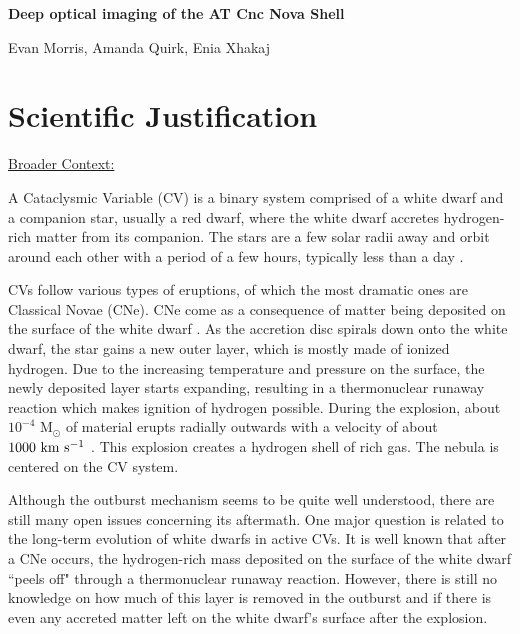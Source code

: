 \documentclass[11pt,a4paper]{article}  %
\begin{document}
\pagestyle{plain}
 


\begin{center}
{\LARGE{\bf
{Deep optical imaging of the AT Cnc Nova Shell}
}}
\end{center}

\centerline{ \large{Evan Morris, Amanda Quirk, Enia Xhakaj}}

\bigskip




\section{Scientific Justification}

\underline{Broader Context:} 

\par A Cataclysmic Variable (CV) is a binary system comprised of a white dwarf and a companion star, usually a red dwarf, where the white dwarf accretes hydrogen-rich matter from its companion. The stars are a few solar radii away and orbit around each other with a period of a few hours, typically less than a day \cite{smith2006Cataclysmic}. 

CVs follow various types of eruptions, of which the most dramatic ones are Classical Novae (CNe). CNe come as a consequence of matter being deposited on the surface of the white dwarf \cite{starrfield2016thermonuclear}. As the accretion disc spirals down onto the white dwarf, the star gains a new outer layer, which is mostly made of ionized hydrogen. Due to the increasing temperature and pressure on the surface, the newly deposited layer starts expanding, resulting in a thermonuclear runaway reaction which makes ignition of hydrogen possible. During the explosion, about $10^{-4}$ M$_{\odot}$ of material erupts radially outwards with a velocity of about $1000~\rm km~s^{-1}$ \cite{seaquist1989detailed}. This explosion creates a hydrogen shell of rich gas. The nebula is centered on the CV system. 

Although the outburst mechanism seems to be quite well understood, there are still many open issues concerning its aftermath. One major question is related to the long-term evolution of white dwarfs in active CVs. It is well known that after a CNe occurs, the hydrogen-rich mass deposited on the surface of the white dwarf ``peels off" through a thermonuclear runaway reaction. However, there is still no knowledge on how much of this layer is removed in the outburst and if there is even any accreted matter left on the white dwarf's surface after the explosion. 
\end{document}
